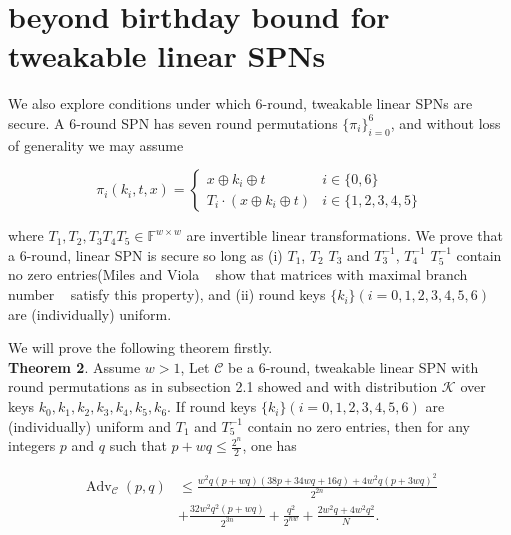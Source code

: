 

\section{beyond birthday bound for tweakable linear SPNs}
\label{section:beyond birthday bound for tweakable linear SPNs}

We also explore conditions under which 6-round, tweakable linear SPNs are secure. A 6-round SPN has seven round permutations $\{\pi_i\}_{i=0}^6$, and without loss of generality we may assume

$$
\pi_{i}\left(k_{i}, t, x\right)=\left\{\begin{array}{ll}
{x \oplus k_{i} \oplus t} & {i \in\{0,6\}} \\
{T_{i} \cdot\left(x \oplus k_{i} \oplus t \right)} & {i \in\{1,2,3,4,5\}}
\end{array}\right.
$$

where $T_{1}, T_{2}, T_{3} T_{4} T_{5}\in \mathbb{F}^{w \times w}$ are invertible linear transformations. We prove that a 6-round, linear SPN is secure so long as (i) $T_1$, $T_2$ $T_3$ and $T_{3}^{-1}$, $T_{4}^{-1}$ $T_{5}^{-1}$ contain no zero entries(Miles and Viola ~\cite{miles2015substitution} show that matrices with maximal branch number ~\cite{daemen1995cipher} satisfy this property), and (ii) round keys $\{k_i\}(i=0, 1, 2, 3, 4, 5, 6)$ are (individually) uniform.

We will prove the following theorem firstly.\\

\noindent
\textbf{Theorem 2}. Assume $w>1$, Let $\mathcal{C}$ be a 6-round, tweakable linear SPN with round permutations as in subsection 2.1 showed and with distribution $\mathcal{K}$ over keys $k_{0}, k_{1}, k_{2}, k_{3}, k_{4}, k_{5}, k_{6}$. If round keys $\{k_i\}(i=0, 1, 2, 3, 4, 5, 6)$ are (individually) uniform and $T_1$ and $T_{5}^{-1}$ contain no zero entries, then for any integers $\mathit{p}$ and $\mathit{q}$ such that $p+wq \leq \frac{2^n}{2}$, one has

\begin{equation}
\begin{aligned}
\operatorname{Adv}_{\mathcal{C}}\left(p, q\right) &\leq \frac{w^2q(p+wq)(38p+34wq+16q)+4w^2q(p+3wq)^2}{2^{2n}}\\
& + \frac{32 w^2 q^2 (p+w q)}{2^{3n}}+\frac{q^2}{2^{nw}} + \frac{2 w^2 q + 4 w^2 q^2}{N}.
\end{aligned}
\end{equation}


